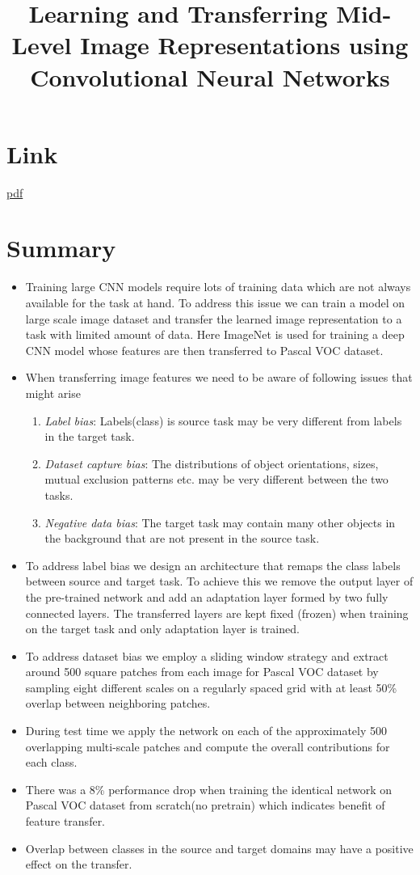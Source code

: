 \documentclass{article}
\title{Learning and Transferring Mid-Level Image Representations
using Convolutional Neural Networks}
\author{}
\date{}
\begin{document}
\maketitle

\section*{Link}
\href{https://www.cv-foundation.org/openaccess/content_cvpr_2014/papers/Oquab_Learning_and_Transferring_2014_CVPR_paper.pdf}{pdf} 


\section*{Summary}
\begin{itemize}
    \item Training large CNN models require lots of training data which are not always available for the task at hand. To address this issue we can train a model on large scale image dataset and transfer the learned image representation to a task with limited amount of data. Here ImageNet is used for training a deep CNN model whose features are then transferred to Pascal VOC dataset.
    \item When transferring image features we need to be aware of following issues that might arise
    \begin{enumerate}
        \item \textit{Label bias}: Labels(class) is source task may be very different from labels in the target task.
        \item \textit{Dataset capture bias}: The distributions of object orientations, sizes, mutual exclusion patterns etc. may be very different between the two tasks.
        \item \textit{Negative data bias}: The target task may contain many other objects in the background that are not present in the source task.
    \end{enumerate}
    \item To address label bias we design an architecture that remaps the class labels between source and target task. To achieve this we remove the output layer of the pre-trained network and add an adaptation layer formed by two fully connected layers. The transferred layers are kept fixed (frozen) when training on the target task and only adaptation layer is trained.
    \item To address dataset bias we employ a sliding window strategy and extract around 500 square patches from each image for Pascal VOC dataset by sampling eight different scales on a regularly spaced grid with at least 50\% overlap between neighboring patches.
    \item During test time we apply the network on each of the approximately 500 overlapping multi-scale patches and compute the overall contributions for each class. 
    \item There was a 8\% performance drop when training the identical network on Pascal VOC dataset from scratch(no pretrain) which indicates benefit of feature transfer. 
    \item Overlap between classes in the source and target domains may have a positive effect on the transfer.  
\end{itemize}
\end{document}
